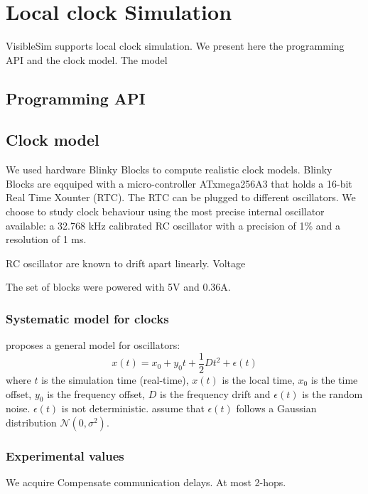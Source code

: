 \documentclass[11pt]{article}
\begin{document}
\section{Local clock Simulation}

VisibleSim supports local clock simulation. We present here the programming API and the clock model. The model

\subsection{Programming API}

\subsection{Clock model}

We used hardware Blinky Blocks to compute realistic clock models. Blinky Blocks are eqquiped with a micro-controller ATxmega256A3 that holds a 16-bit Real Time Xounter (RTC). The RTC can be plugged to different oscillators. We choose to study clock behaviour using the most precise internal oscillator available: a 32.768 kHz calibrated RC oscillator with a precision of 1\% and a resolution of 1 ms.

RC oscillator are known to drift apart linearly.
Voltage 

The set of blocks were powered with 5V and 0.36A. 

\subsubsection{Systematic model for clocks}

\cite{allan1987time} proposes a general model for oscillators:
\begin{equation}
x(t) = x_0 + y_0t + \frac{1}{2}Dt^2 + \epsilon(t)
\end{equation}
where $t$ is the simulation time (real-time), $x(t)$ is the local time, $x_0$ is the time offset, $y_0$ is the frequency offset, $D$ is the frequency drift and $\epsilon(t)$ is the random noise. $\epsilon(t)$ is not deterministic. \cite{ma2007understanding} assume that $\epsilon(t)$ follows a Gaussian distribution $\mathcal{N}(0,\sigma^2)$. 

\subsubsection{Experimental values}

We acquire
Compensate communication delays.
At most 2-hops.
\end{document}
